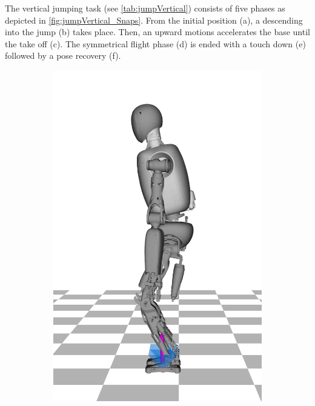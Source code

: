 The vertical jumping task (see \cref{tab:jumpVertical}) consists of five phases as depicted in \cref{fig:jumpVertical_Snaps}. From the initial position (a), a descending into the jump (b) takes place. Then, an upward motions accelerates the base until the take off (c). The symmetrical flight phase (d) is ended with a touch down (e) followed by a pose recovery (f). 

\begin{figure}[h!]
\begin{subfigure}{.16\textwidth}
	\includegraphics[width=1\linewidth]{fig/jumpVertical/snaps/1x}
	\caption{}
	\end{subfigure}%
\begin{subfigure}{.16\textwidth}

\end{subfigure}
\end{figure}
